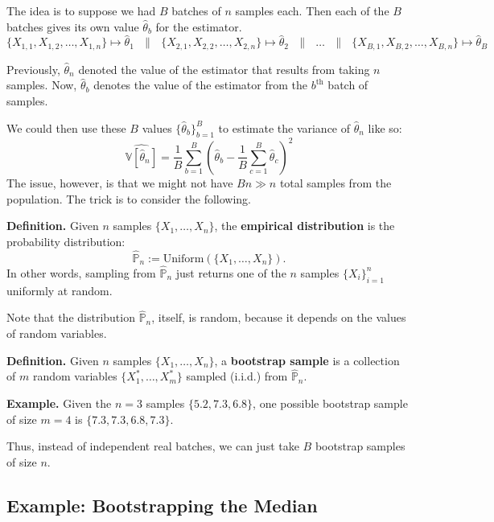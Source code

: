 The idea is to suppose we had $B$ batches of $n$ samples each.
Then each of the $B$ batches gives its own value $\hat{\theta}_b$ for the estimator.
\[ \{X_{1, 1}, X_{1, 2}, \dots, X_{1, n}\} \mapsto \hat{\theta}_1 ~~~ \parallel ~~~
\{X_{2, 1}, X_{2, 2}, \dots, X_{2, n}\} \mapsto \hat{\theta}_2 ~~~ \parallel ~~~
\dots ~~~ \parallel ~~~
\{X_{B, 1}, X_{B, 2}, \dots, X_{B, n}\} \mapsto \hat{\theta}_B  \]
\begin{remark}
    Previously, $\hat{\theta}_n$ denoted
    the value of the estimator that results from taking $n$ samples.
    Now, $\hat{\theta}_b$ denotes the value of the estimator from the $b^{\text{th}}$
    batch of samples.
\end{remark}
We could then use these $B$ values $\{\hat{\theta}_b\}_{b = 1}^B$
to estimate the variance of $\hat{\theta}_n$ like so:
\[ \widehat{\mathbb{V}[\hat{\theta}_n]}
= \frac{1}{B} \sum_{b = 1}^B \left(
    \hat{\theta}_b - \frac{1}{B} \sum_{c = 1}^B \hat{\theta}_c
\right)^2 \]
The issue, however, is that we might not have $Bn \gg n$ total samples from the population.
The trick is to consider the following.

\textbf{Definition.} Given $n$ samples $\{X_1, \dots, X_n\}$,
the \textbf{empirical distribution} is the probability distribution:
\[ \hat{\mathbb{P}}_n := \mathrm{Uniform}(\{X_1, \dots, X_n\}). \]
In other words, sampling from $\hat{\mathbb{P}}_n$ just returns
one of the $n$ samples $\{X_i\}_{i = 1}^n$ uniformly at random.

\begin{remark}
    Note that the distribution $\hat{\mathbb{P}}_n$, itself, is random,
    because it depends on the values of random variables.
\end{remark}

\textbf{Definition.} Given $n$ samples $\{X_1, \dots, X_n\}$,
a \textbf{bootstrap sample} is a collection of $m$ random variables
$\{X_1^*, \dots, X_m^*\}$ sampled (i.i.d.) from $\hat{\mathbb{P}}_n$.

\textbf{Example.} Given the $n = 3$ samples $\{5.2, 7.3, 6.8\}$,
one possible bootstrap sample of size $m = 4$
is $\{7.3, 7.3, 6.8, 7.3\}$.

Thus, instead of independent real batches,
we can just take $B$ bootstrap samples of size $n$.

\subsection{Example: Bootstrapping the Median}

